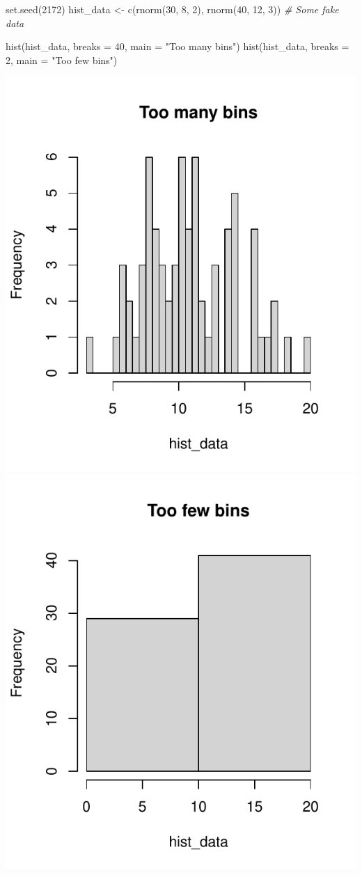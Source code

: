 \documentclass[
  a4paper,
]{book}
\newenvironment{Shaded}{\begin{snugshade}}{\end{snugshade}}
\newcommand{\AttributeTok}[1]{\textcolor[rgb]{0.77,0.63,0.00}{#1}}
\newcommand{\CommentTok}[1]{\textcolor[rgb]{0.56,0.35,0.01}{\textit{#1}}}
\newcommand{\DecValTok}[1]{\textcolor[rgb]{0.00,0.00,0.81}{#1}}
\newcommand{\FunctionTok}[1]{\textcolor[rgb]{0.00,0.00,0.00}{#1}}
\newcommand{\NormalTok}[1]{#1}
\newcommand{\OtherTok}[1]{\textcolor[rgb]{0.56,0.35,0.01}{#1}}
\newcommand{\StringTok}[1]{\textcolor[rgb]{0.31,0.60,0.02}{#1}}
\theoremstyle{definition}
\theoremstyle{definition}
\theoremstyle{definition}
\theoremstyle{definition}
\theoremstyle{remark}
\begin{document}
\begin{Shaded}
\begin{Highlighting}[]
\FunctionTok{set.seed}\NormalTok{(}\DecValTok{2172}\NormalTok{)}
\NormalTok{hist\_data }\OtherTok{\textless{}{-}} \FunctionTok{c}\NormalTok{(}\FunctionTok{rnorm}\NormalTok{(}\DecValTok{30}\NormalTok{, }\DecValTok{8}\NormalTok{, }\DecValTok{2}\NormalTok{), }\FunctionTok{rnorm}\NormalTok{(}\DecValTok{40}\NormalTok{, }\DecValTok{12}\NormalTok{, }\DecValTok{3}\NormalTok{))  }\CommentTok{\# Some fake data}

\FunctionTok{hist}\NormalTok{(hist\_data, }\AttributeTok{breaks =} \DecValTok{40}\NormalTok{, }\AttributeTok{main =} \StringTok{"Too many bins"}\NormalTok{)}
\FunctionTok{hist}\NormalTok{(hist\_data, }\AttributeTok{breaks =} \DecValTok{2}\NormalTok{,  }\AttributeTok{main =} \StringTok{"Too few bins"}\NormalTok{)}
\end{Highlighting}
\end{Shaded}

\includegraphics[width=0.48\linewidth]{math1710_files/figure-latex/hist-bins-1} \includegraphics[width=0.48\linewidth]{math1710_files/figure-latex/hist-bins-2}
\end{document}
